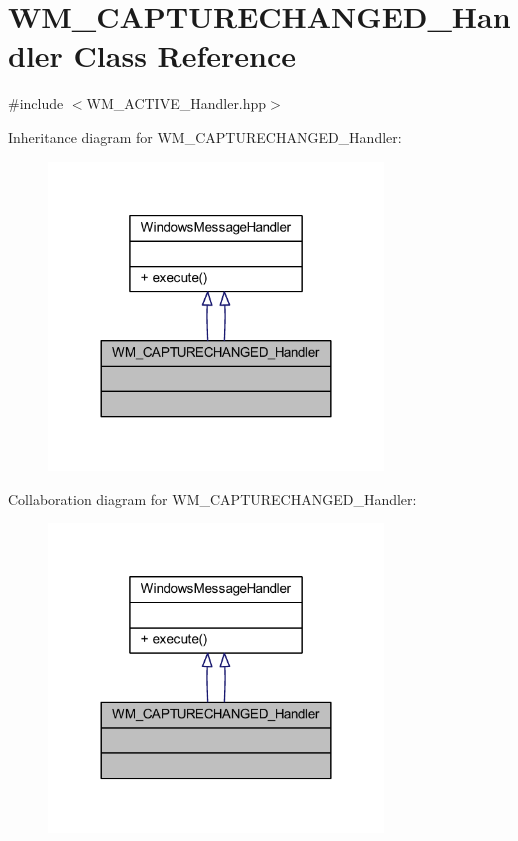 \hypertarget{class_w_m___c_a_p_t_u_r_e_c_h_a_n_g_e_d___handler}{}\section{W\+M\+\_\+\+C\+A\+P\+T\+U\+R\+E\+C\+H\+A\+N\+G\+E\+D\+\_\+\+Handler Class Reference}
\label{class_w_m___c_a_p_t_u_r_e_c_h_a_n_g_e_d___handler}


{\ttfamily \#include $<$W\+M\+\_\+\+A\+C\+T\+I\+V\+E\+\_\+\+Handler.\+hpp$>$}



Inheritance diagram for W\+M\+\_\+\+C\+A\+P\+T\+U\+R\+E\+C\+H\+A\+N\+G\+E\+D\+\_\+\+Handler\+:\nopagebreak
\begin{figure}[H]
\begin{center}
\leavevmode
\includegraphics[width=252pt]{class_w_m___c_a_p_t_u_r_e_c_h_a_n_g_e_d___handler__inherit__graph}
\end{center}
\end{figure}


Collaboration diagram for W\+M\+\_\+\+C\+A\+P\+T\+U\+R\+E\+C\+H\+A\+N\+G\+E\+D\+\_\+\+Handler\+:\nopagebreak
\begin{figure}[H]
\begin{center}
\leavevmode
\includegraphics[width=252pt]{class_w_m___c_a_p_t_u_r_e_c_h_a_n_g_e_d___handler__coll__graph}
\end{center}
\end{figure}
